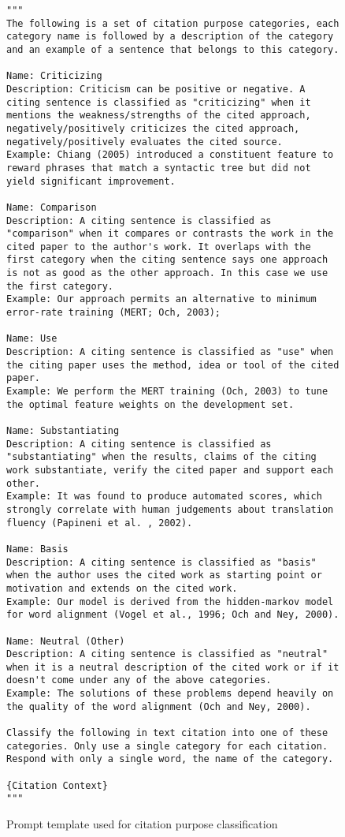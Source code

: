 \documentclass[sigconf]{acmart}
\begin{document}
\begin{figure}
\begin{lstlisting}
"""
The following is a set of citation purpose categories, each category name is followed by a description of the category and an example of a sentence that belongs to this category.

Name: Criticizing
Description: Criticism can be positive or negative. A citing sentence is classified as "criticizing" when it mentions the weakness/strengths of the cited approach, negatively/positively criticizes the cited approach, negatively/positively evaluates the cited source.
Example: Chiang (2005) introduced a constituent feature to reward phrases that match a syntactic tree but did not yield significant improvement.

Name: Comparison
Description: A citing sentence is classified as "comparison" when it compares or contrasts the work in the cited paper to the author's work. It overlaps with the first category when the citing sentence says one approach is not as good as the other approach. In this case we use the first category.
Example: Our approach permits an alternative to minimum error-rate training (MERT; Och, 2003);

Name: Use
Description: A citing sentence is classified as "use" when the citing paper uses the method, idea or tool of the cited paper.
Example: We perform the MERT training (Och, 2003) to tune the optimal feature weights on the development set.

Name: Substantiating
Description: A citing sentence is classified as "substantiating" when the results, claims of the citing work substantiate, verify the cited paper and support each other.
Example: It was found to produce automated scores, which strongly correlate with human judgements about translation fluency (Papineni et al. , 2002).

Name: Basis
Description: A citing sentence is classified as "basis" when the author uses the cited work as starting point or motivation and extends on the cited work.
Example: Our model is derived from the hidden-markov model for word alignment (Vogel et al., 1996; Och and Ney, 2000).

Name: Neutral (Other)
Description: A citing sentence is classified as "neutral" when it is a neutral description of the cited work or if it doesn't come under any of the above categories.
Example: The solutions of these problems depend heavily on the quality of the word alignment (Och and Ney, 2000).

Classify the following in text citation into one of these categories. Only use a single category for each citation. Respond with only a single word, the name of the category.

{Citation Context}
"""
\end{lstlisting}
\caption{Prompt template used for citation purpose classification}
\label{figure:prompt-template}
\end{figure}
\end{document}
